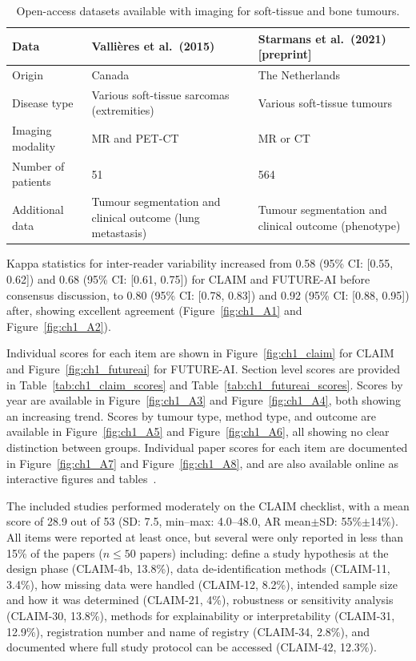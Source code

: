 \begin{table}[htbp]
	\caption{Open-access datasets available with imaging for soft-tissue and bone tumours.}
	\label{tab:ch1_datasets}
	\small
	\begin{tabular}{@{}p{3cm}p{4.6cm}p{4.6cm}@{}}
		\toprule
		\textbf{Data} & \textbf{Valli\`eres et al.\ (2015)~\autocite{vallieres2015}} & \textbf{Starmans et al.\ (2021) [preprint]~\autocite{starmans2021worc}} \\
		\midrule
		Origin & Canada & The Netherlands \\
		Disease type & Various soft-tissue sarcomas (extremities) & Various soft-tissue tumours \\
		Imaging modality & MR and PET-CT & MR or CT \\
		Number of patients & 51 & 564 \\
		Additional data & Tumour segmentation and clinical outcome (lung metastasis) & Tumour segmentation and clinical outcome (phenotype) \\
		\bottomrule
	\end{tabular}
\end{table}

Kappa statistics for inter-reader variability increased from 0.58 (95\% CI: [0.55, 0.62]) and 0.68 (95\% CI: [0.61, 0.75]) for CLAIM and FUTURE-AI before consensus discussion, to 0.80 (95\% CI: [0.78, 0.83]) and 0.92 (95\% CI: [0.88, 0.95]) after, showing excellent agreement (Figure~\ref{fig:ch1_A1} and Figure~\ref{fig:ch1_A2}).

Individual scores for each item are shown in Figure~\ref{fig:ch1_claim} for CLAIM and Figure~\ref{fig:ch1_futureai} for FUTURE-AI.
Section level scores are provided in Table~\ref{tab:ch1_claim_scores} and Table~\ref{tab:ch1_futureai_scores}.
Scores by year are available in Figure~\ref{fig:ch1_A3} and Figure~\ref{fig:ch1_A4}, both showing an increasing trend.
Scores by tumour type, method type, and outcome are available in Figure~\ref{fig:ch1_A5} and Figure~\ref{fig:ch1_A6}, all showing no clear distinction between groups.
Individual paper scores for each item are documented in Figure~\ref{fig:ch1_A7} and Figure~\ref{fig:ch1_A8}, and are also available online as interactive figures and tables~\autocite{spaanderman2024zenodo}.

The included studies performed moderately on the CLAIM checklist, with a mean score of 28.9 out of 53 (SD: 7.5, min--max: 4.0--48.0, AR mean$\pm$SD: 55\%$\pm$14\%).
All items were reported at least once, but several were only reported in less than 15\% of the papers ($n \leq 50$ papers) including: define a study hypothesis at the design phase (CLAIM-4b, 13.8\%), data de-identification methods (CLAIM-11, 3.4\%), how missing data were handled (CLAIM-12, 8.2\%), intended sample size and how it was determined (CLAIM-21, 4\%), robustness or sensitivity analysis (CLAIM-30, 13.8\%), methods for explainability or interpretability (CLAIM-31, 12.9\%), registration number and name of registry (CLAIM-34, 2.8\%), and documented where full study protocol can be accessed (CLAIM-42, 12.3\%).

